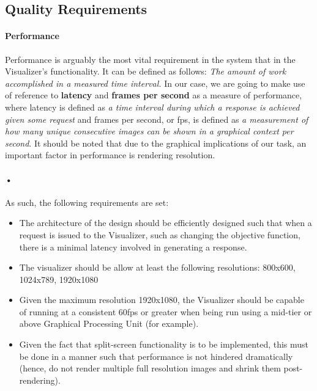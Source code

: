 \documentclass[11pt]{article}
\begin{document}
\subsection{Quality Requirements}
\paragraph{Performance}
Performance is arguably the most vital requirement in the system that in the Visualizer's functionality. It can be defined as follows:
\newline\textit{The amount of work accomplished in a measured time interval.}
\newline In our case, we are going to make use of reference to \textbf{latency} and \textbf{frames per second} as a measure of performance, where latency is defined as \textit{a time interval during which a response is achieved given some request} and frames per second, or fps, is defined as \textit{a measurement of how many unique consecutive images can be shown in a graphical context per second}. It should be noted that due to the graphical implications of our task, an important factor in performance is rendering resolution.
\paragraph{•}
As such, the following requirements are set:
\begin{itemize}
	\item The architecture of the design should be efficiently designed such that when a request is issued to the Visualizer, such as changing the objective function, there is a minimal latency involved in generating a response.
	\item The visualizer should be allow at least the following resolutions: 800x600, 1024x789, 1920x1080
	\item Given the maximum resolution 1920x1080, the Visualizer should be capable of running at a consistent 60fps or greater when being run using a mid-tier or above Graphical Processing Unit (for example).
	\item Given the fact that split-screen functionality is to be implemented, this must be done in a manner such that performance is not hindered dramatically (hence, do not render multiple full resolution images and shrink them post-rendering).
\end{itemize}
\end{document}
